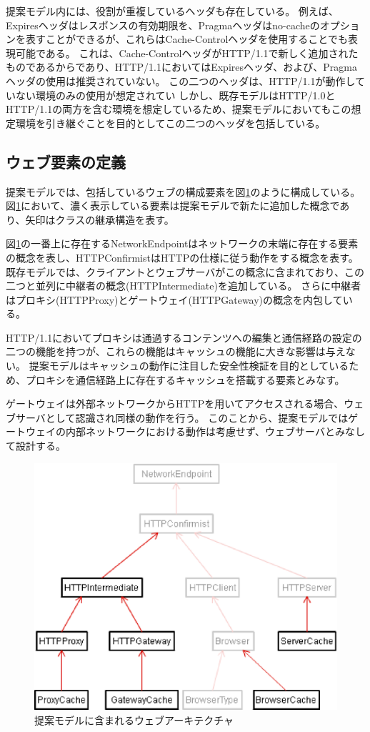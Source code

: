 \documentclass{css}
\begin{document}
提案モデル内には、役割が重複しているヘッダも存在している。
例えば、Expiresヘッダはレスポンスの有効期限を、Pragmaヘッダはno-cacheのオプションを表すことができるが、これらはCache-Controlヘッダを使用することでも表現可能である。
これは、Cache-ControlヘッダがHTTP/1.1で新しく追加されたものであるからであり、HTTP/1.1においてはExpiresヘッダ、および、Pragmaヘッダの使用は推奨されていない。
この二つのヘッダは、HTTP/1.1が動作していない環境のみの使用が想定されてい
しかし、既存モデルはHTTP/1.0とHTTP/1.1の両方を含む環境を想定しているため、提案モデルにおいてもこの想定環境を引き継ぐことを目的としてこの二つのヘッダを包括している。

\subsection{ウェブ要素の定義}
提案モデルでは、包括しているウェブの構成要素を図\ref{fig:model_header}のように構成している。
図\ref{fig:model_header}において、濃く表示している要素は提案モデルで新たに追加した概念であり、矢印はクラスの継承構造を表す。

図\ref{fig:model_header}の一番上に存在するNetworkEndpointはネットワークの末端に存在する要素の概念を表し、HTTPConfirmistはHTTPの仕様に従う動作をする概念を表す。
既存モデルでは、クライアントとウェブサーバがこの概念に含まれており、この二つと並列に中継者の概念(HTTPIntermediate)を追加している。
さらに中継者はプロキシ(HTTPProxy)とゲートウェイ(HTTPGateway)の概念を内包している。

HTTP/1.1においてプロキシは通過するコンテンツへの編集と通信経路の設定の二つの機能を持つが、これらの機能はキャッシュの機能に大きな影響は与えない。
提案モデルはキャッシュの動作に注目した安全性検証を目的としているため、プロキシを通信経路上に存在するキャッシュを搭載する要素とみなす。

ゲートウェイは外部ネットワークからHTTPを用いてアクセスされる場合、ウェブサーバとして認識され同様の動作を行う。
このことから、提案モデルではゲートウェイの内部ネットワークにおける動作は考慮せず、ウェブサーバとみなして設計する。

\begin{figure}[htb]
\centering
\includegraphics[width=0.8\hsize]{model_archi.eps}
\caption{提案モデルに含まれるウェブアーキテクチャ}
\label{fig:model_header}
\end{figure}
\end{document}
